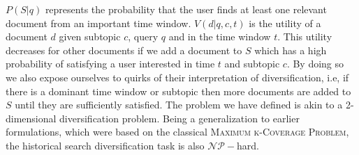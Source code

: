 $P(S|q)$ represents the probability that the user finds at least one relevant document from an important time window. 
$V(d|q,c,t)$ is the utility of a document $d$ given subtopic $c$, query $q$ and in the time window $t$. This utility decreases for other documents if we add a document to $S$ which has a high probability of satisfying a user interested in time $t$ and subtopic $c$. By doing so we also expose ourselves to quirks of their interpretation of diversification, i.e, if there is a dominant time window or subtopic then more documents are added to $S$ until they are sufficiently satisfied. The problem we have defined is akin to a 2-dimensional diversification problem. Being a generalization to earlier formulations, which were based on the classical \textsc{Maximum k-Coverage Problem}, the historical search diversification task is also $\mathcal{NP}-$hard.  






